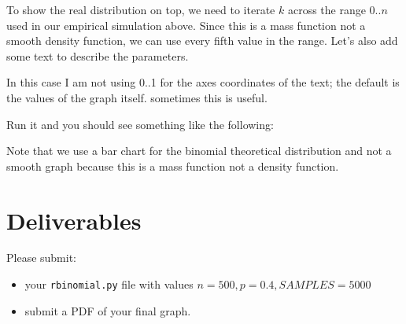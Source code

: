 \begin{fullwidth}
\step To show the real distribution on top, we need to iterate $k$ across the range $0..n$ used in our empirical  simulation above.  Since this is a mass function not a smooth density function, we can use every fifth value in the range. Let's also add some text to describe the parameters.


In this case I am not using 0..1 for the axes coordinates of the text; the default is the values of the graph itself. sometimes this is useful.

\step Run it and you should see something like the following:


Note that we use a bar chart for the binomial theoretical distribution and not a smooth graph because this is a mass function not a density function.

\section{Deliverables}

Please submit:

\begin{itemize}
\item your {\tt rbinomial.py} file with values $n=500, p=0.4, SAMPLES=5000$
\item submit a PDF of your final graph.
\end{itemize}

\end{fullwidth}
